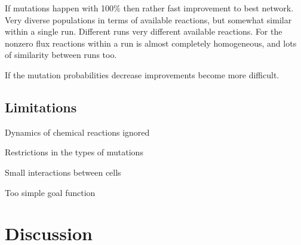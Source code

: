 \documentclass[10pt,a4paper]{article}
\begin{document}
If mutations happen with 100$\%$ then rather fast improvement to best network. Very diverse populations in terms of available reactions, but somewhat similar within a single run. Different runs very different available reactions. For the nonzero flux reactions within a run is almost completely homogeneous, and lots of similarity between runs too. 

If the mutation probabilities decrease improvements become more difficult.

\subsection{Limitations}
\label{sub:limitations}
Dynamics of chemical reactions ignored

Restrictions in the types of mutations

Small interactions between cells

Too simple goal function



\section{Discussion}
\label{sec:discussion}
\end{document}
